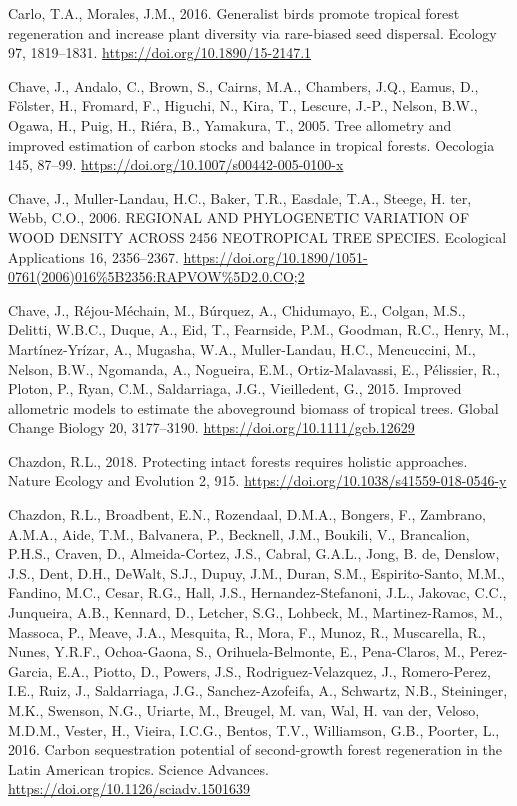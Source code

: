\documentclass[
  12pt,
]{article}
\newlength{\cslhangindent}
\newlength{\cslentryspacingunit} %
\newenvironment{CSLReferences}[2] %
 {%
  \setlength{\parindent}{0pt}
  \ifodd #1
  \let\oldpar\par
  \def\par{\hangindent=\cslhangindent\oldpar}
  \fi
  \setlength{\parskip}{#2\cslentryspacingunit}
 }%
 {}
\begin{document}
\begin{CSLReferences}{1}{0}
\leavevmode{}%
Carlo, T.A., Morales, J.M., 2016. Generalist birds promote tropical forest regeneration and increase plant diversity via rare-biased seed dispersal. Ecology 97, 1819--1831. \url{https://doi.org/10.1890/15-2147.1}

\leavevmode{}%
Chave, J., Andalo, C., Brown, S., Cairns, M.A., Chambers, J.Q., Eamus, D., Fölster, H., Fromard, F., Higuchi, N., Kira, T., Lescure, J.-P., Nelson, B.W., Ogawa, H., Puig, H., Riéra, B., Yamakura, T., 2005. Tree allometry and improved estimation of carbon stocks and balance in tropical forests. Oecologia 145, 87--99. \url{https://doi.org/10.1007/s00442-005-0100-x}

\leavevmode{}%
Chave, J., Muller-Landau, H.C., Baker, T.R., Easdale, T.A., Steege, H. ter, Webb, C.O., 2006. {REGIONAL AND PHYLOGENETIC VARIATION OF WOOD DENSITY ACROSS} 2456 {NEOTROPICAL TREE SPECIES}. Ecological Applications 16, 2356--2367. \url{https://doi.org/10.1890/1051-0761(2006)016\%5B2356:RAPVOW\%5D2.0.CO;2}

\leavevmode{}%
Chave, J., Réjou-Méchain, M., Búrquez, A., Chidumayo, E., Colgan, M.S., Delitti, W.B.C., Duque, A., Eid, T., Fearnside, P.M., Goodman, R.C., Henry, M., Martínez-Yrízar, A., Mugasha, W.A., Muller-Landau, H.C., Mencuccini, M., Nelson, B.W., Ngomanda, A., Nogueira, E.M., Ortiz-Malavassi, E., Pélissier, R., Ploton, P., Ryan, C.M., Saldarriaga, J.G., Vieilledent, G., 2015. Improved allometric models to estimate the aboveground biomass of tropical trees. Global Change Biology 20, 3177--3190. \url{https://doi.org/10.1111/gcb.12629}

\leavevmode{}%
Chazdon, R.L., 2018. Protecting intact forests requires holistic approaches. Nature Ecology and Evolution 2, 915. \url{https://doi.org/10.1038/s41559-018-0546-y}

\leavevmode{}%
Chazdon, R.L., Broadbent, E.N., Rozendaal, D.M.A., Bongers, F., Zambrano, A.M.A., Aide, T.M., Balvanera, P., Becknell, J.M., Boukili, V., Brancalion, P.H.S., Craven, D., Almeida-Cortez, J.S., Cabral, G.A.L., Jong, B. de, Denslow, J.S., Dent, D.H., DeWalt, S.J., Dupuy, J.M., Duran, S.M., Espirito-Santo, M.M., Fandino, M.C., Cesar, R.G., Hall, J.S., Hernandez-Stefanoni, J.L., Jakovac, C.C., Junqueira, A.B., Kennard, D., Letcher, S.G., Lohbeck, M., Martinez-Ramos, M., Massoca, P., Meave, J.A., Mesquita, R., Mora, F., Munoz, R., Muscarella, R., Nunes, Y.R.F., Ochoa-Gaona, S., Orihuela-Belmonte, E., Pena-Claros, M., Perez-Garcia, E.A., Piotto, D., Powers, J.S., Rodriguez-Velazquez, J., Romero-Perez, I.E., Ruiz, J., Saldarriaga, J.G., Sanchez-Azofeifa, A., Schwartz, N.B., Steininger, M.K., Swenson, N.G., Uriarte, M., Breugel, M. van, Wal, H. van der, Veloso, M.D.M., Vester, H., Vieira, I.C.G., Bentos, T.V., Williamson, G.B., Poorter, L., 2016. Carbon sequestration potential of second-growth forest regeneration in the {Latin American} tropics. Science Advances. \url{https://doi.org/10.1126/sciadv.1501639}


\end{CSLReferences}
\end{document}
